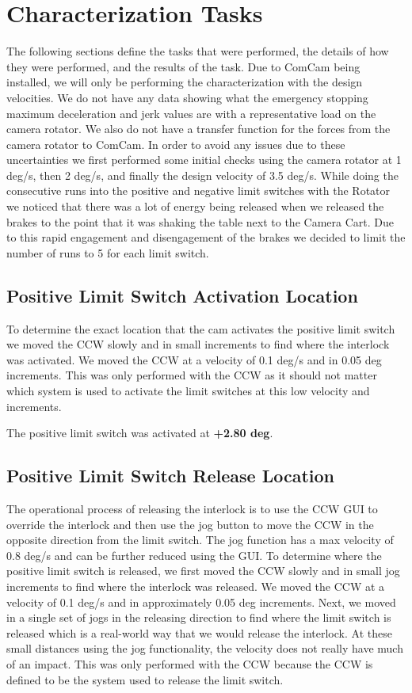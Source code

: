\documentclass[SE,authoryear,toc, lsstdraft]{lsstdoc}
\begin{document}
\section{Characterization Tasks}\label{sec:Characterization Tasks}

The following sections define the tasks that were performed, the details of
how they were performed, and the results of the task. Due to ComCam being installed,
we will only be performing the characterization with the design velocities.
We do not have any data showing what the emergency stopping maximum deceleration and
jerk values are with a representative load on the camera rotator.
We also do not have a transfer function for the forces from the camera rotator to ComCam.
In order to avoid any issues due to these uncertainties we first performed some initial checks using
the camera rotator at 1 deg/s, then 2 deg/s, and finally the design velocity of 3.5 deg/s.
While doing the consecutive runs into the positive and negative limit switches with the
Rotator we noticed that there was a lot of energy being released when we released the brakes to the
point that it was shaking the table next to the Camera Cart. Due to this rapid engagement and
disengagement of the brakes we decided to limit the number of runs to 5 for each limit switch.


\subsection{Positive Limit Switch Activation Location}\label{sec:Positive Activation}

To determine the exact location that the cam activates the positive
limit switch we moved the CCW slowly and in small increments to find
where the interlock was activated. We moved the CCW at a velocity of 0.1
deg/s and in 0.05 deg increments. This was only performed with the CCW
as it should not matter which system is used to activate the limit
switches at this low velocity and increments.

The positive limit switch was activated at \textbf{+2.80 deg}.

\subsection{Positive Limit Switch Release Location}

The operational process of releasing the interlock is to use the CCW GUI to override the interlock
and then use the jog button to move the CCW in the opposite direction from the limit switch.
The jog function has a max velocity of 0.8 deg/s and can be further reduced using the GUI.
To determine where the positive limit switch is released, we first moved
the CCW slowly and in small jog increments to find where the interlock was
released. We moved the CCW at a velocity of 0.1 deg/s and in approximately 0.05 deg
increments. Next, we moved in a single set of jogs in the releasing direction to find where the limit switch
is released which is a real-world way that we would release the interlock. At these small
distances using the jog functionality, the velocity does not really have much of an impact.
This was only performed with the CCW because the CCW is defined to be the system used to
release the limit switch.
\end{document}
